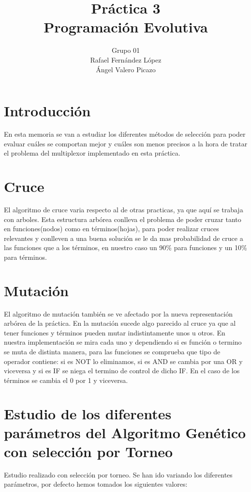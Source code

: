 \documentclass[12pt]{article}
\title{Práctica 3\\Programación Evolutiva}
\author{Grupo 01\\Rafael Fernández López\\Ángel Valero Picazo}
\date{}
\begin{document}
\maketitle
\newpage
\newpage
\tableofcontents
\newpage

\section{Introducción}

	En esta memoria se van a estudiar los diferentes métodos de selección para poder
    evaluar cuáles se comportan mejor y cuáles son menos precisos a la hora de tratar el problema del
    multiplexor implementado en esta práctica.


\section{Cruce}

	El algoritmo de cruce varia respecto al de otras practicas, ya que aquí se trabaja con arboles. Esta estructura arbórea conlleva el problema de poder cruzar tanto en funciones(nodos) como en términos(hojas), para poder realizar cruces relevantes y conlleven a una buena solución se le da mas probabilidad de cruce a las funciones que a los términos, en nuestro caso un 90\% para funciones y un 10\% para términos. 

\section{Mutación}

	El algoritmo de mutación también se ve afectado por la nueva representación arbórea de la práctica. En la mutación sucede algo parecido al cruce ya que al tener funciones y términos pueden mutar indistintamente unos u otros. En nuestra implementación se mira cada uno y dependiendo si es función o termino se muta de distinta manera, para las funciones se comprueba que tipo de operador contiene: si es NOT lo eliminamos, si es AND se cambia por una OR y viceversa y si es IF se niega el termino de control de dicho IF. En el caso de los términos se cambia el 0 por 1 y viceversa.

\section{Estudio de los diferentes parámetros del Algoritmo Genético con selección por Torneo}

	Estudio realizado con selección por torneo. Se han ido variando los diferentes parámetros, por defecto hemos tomados los siguientes valores:
\end{document}

